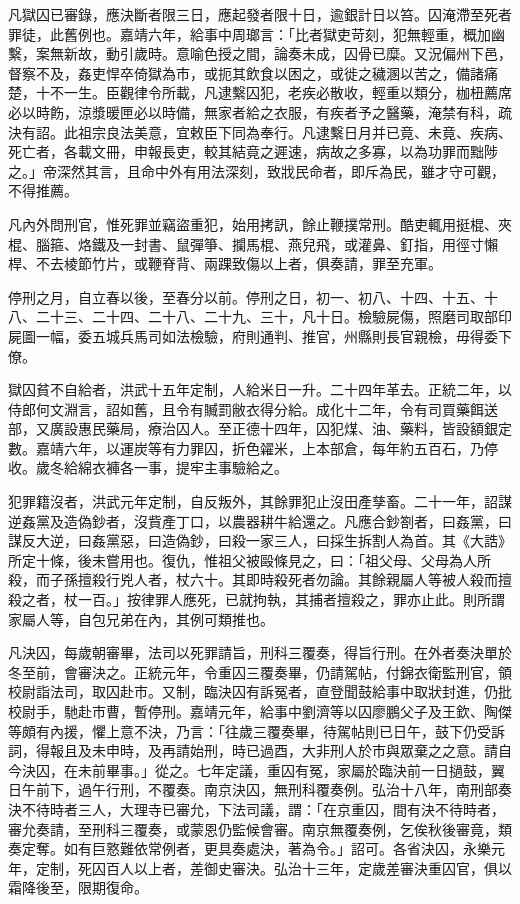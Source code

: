 凡獄囚已審錄，應決斷者限三日，應起發者限十日，逾銀計日以笞。囚淹滯至死者罪徒，此舊例也。嘉靖六年，給事中周瑯言：「比者獄吏苛刻，犯無輕重，概加幽繫，案無新故，動引歲時。意喻色授之間，論奏未成，囚骨已糜。又況偏州下邑，督察不及，姦吏悍卒倚獄為市，或扼其飲食以困之，或徙之穢溷以苦之，備諸痛楚，十不一生。臣觀律令所載，凡逮繫囚犯，老疾必散收，輕重以類分，枷杻薦席必以時飭，涼漿暖匣必以時備，無家者給之衣服，有疾者予之醫藥，淹禁有科，疏決有詔。此祖宗良法美意，宜敕臣下同為奉行。凡逮繫日月并已竟、未竟、疾病、死亡者，各載文冊，申報長吏，較其結竟之遲速，病故之多寡，以為功罪而黜陟之。」帝深然其言，且命中外有用法深刻，致戕民命者，即斥為民，雖才守可觀，不得推薦。

凡內外問刑官，惟死罪並竊盜重犯，始用拷訊，餘止鞭撲常刑。酷吏輒用挺棍、夾棍、腦箍、烙鐵及一封書、鼠彈箏、攔馬棍、燕兒飛，或灌鼻、釘指，用徑寸懶桿、不去棱節竹片，或鞭脊背、兩踝致傷以上者，俱奏請，罪至充軍。

停刑之月，自立春以後，至春分以前。停刑之日，初一、初八、十四、十五、十八、二十三、二十四、二十八、二十九、三十，凡十日。檢驗屍傷，照磨司取部印屍圖一幅，委五城兵馬司如法檢驗，府則通判、推官，州縣則長官親檢，毋得委下僚。

獄囚貧不自給者，洪武十五年定制，人給米日一升。二十四年革去。正統二年，以侍郎何文淵言，詔如舊，且令有贓罰敝衣得分給。成化十二年，令有司買藥餌送部，又廣設惠民藥局，療治囚人。至正德十四年，囚犯煤、油、藥料，皆設額銀定數。嘉靖六年，以運炭等有力罪囚，折色糴米，上本部倉，每年約五百石，乃停收。歲冬給綿衣褲各一事，提牢主事驗給之。

犯罪籍沒者，洪武元年定制，自反叛外，其餘罪犯止沒田產孳畜。二十一年，詔謀逆姦黨及造偽鈔者，沒貲產丁口，以農器耕牛給還之。凡應合鈔劄者，曰姦黨，曰謀反大逆，曰姦黨惡，曰造偽鈔，曰殺一家三人，曰採生拆割人為首。其《大誥》所定十條，後未嘗用也。復仇，惟祖父被毆條見之，曰：「祖父母、父母為人所殺，而子孫擅殺行兇人者，杖六十。其即時殺死者勿論。其餘親屬人等被人殺而擅殺之者，杖一百。」按律罪人應死，已就拘執，其捕者擅殺之，罪亦止此。則所謂家屬人等，自包兄弟在內，其例可類推也。

凡決囚，每歲朝審畢，法司以死罪請旨，刑科三覆奏，得旨行刑。在外者奏決單於冬至前，會審決之。正統元年，令重囚三覆奏畢，仍請駕帖，付錦衣衛監刑官，領校尉詣法司，取囚赴市。又制，臨決囚有訴冤者，直登聞鼓給事中取狀封進，仍批校尉手，馳赴市曹，暫停刑。嘉靖元年，給事中劉濟等以囚廖鵬父子及王欽、陶傑等頗有內援，懼上意不決，乃言：「往歲三覆奏畢，待駕帖則已日午，鼓下仍受訴詞，得報且及未申時，及再請始刑，時已過酉，大非刑人於市與眾棄之之意。請自今決囚，在未前畢事。」從之。七年定議，重囚有冤，家屬於臨決前一日撾鼓，翼日午前下，過午行刑，不覆奏。南京決囚，無刑科覆奏例。弘治十八年，南刑部奏決不待時者三人，大理寺已審允，下法司議，謂：「在京重囚，間有決不待時者，審允奏請，至刑科三覆奏，或蒙恩仍監候會審。南京無覆奏例，乞俟秋後審竟，類奏定奪。如有巨憝難依常例者，更具奏處決，著為令。」詔可。各省決囚，永樂元年，定制，死囚百人以上者，差御史審決。弘治十三年，定歲差審決重囚官，俱以霜降後至，限期復命。

